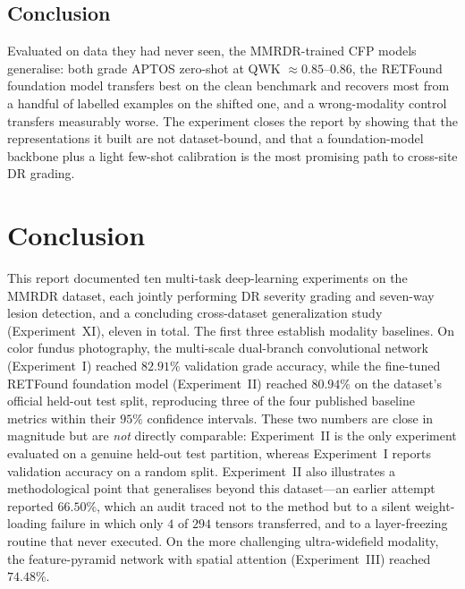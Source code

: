\documentclass[journal,twoside,web]{ieeecolor}
\begin{document}
\subsection{Conclusion}
Evaluated on data they had never seen, the MMRDR-trained CFP models generalise: both
grade APTOS zero-shot at QWK $\approx0.85$--$0.86$, the RETFound foundation model
transfers best on the clean benchmark and recovers most from a handful of labelled
examples on the shifted one, and a wrong-modality control transfers measurably worse.
The experiment closes the report by showing that the representations it built are not
dataset-bound, and that a foundation-model backbone plus a light few-shot calibration
is the most promising path to cross-site DR grading.

\section{Conclusion}
\label{sec:conclusion}
This report documented ten multi-task deep-learning experiments on the MMRDR
dataset, each jointly performing DR severity grading and seven-way lesion
detection, and a concluding cross-dataset generalization study (Experiment~XI),
eleven in total. The first three establish modality baselines. On color fundus
photography, the multi-scale dual-branch convolutional network (Experiment~I)
reached $82.91\%$ validation grade accuracy, while the fine-tuned RETFound
foundation model (Experiment~II) reached $80.94\%$ on the dataset's official
held-out test split, reproducing three of the four published baseline metrics
within their $95\%$ confidence intervals. These two numbers are close in magnitude
but are \emph{not} directly comparable: Experiment~II is the only experiment
evaluated on a genuine held-out test partition, whereas Experiment~I reports
validation accuracy on a random split. Experiment~II also illustrates a
methodological point that generalises beyond this dataset---an earlier attempt
reported $66.50\%$, which an audit traced not to the method but to a silent
weight-loading failure in which only $4$ of $294$ tensors transferred, and to a
layer-freezing routine that never executed. On the more challenging ultra-widefield
modality, the feature-pyramid network with spatial attention (Experiment~III)
reached $74.48\%$.
\end{document}

